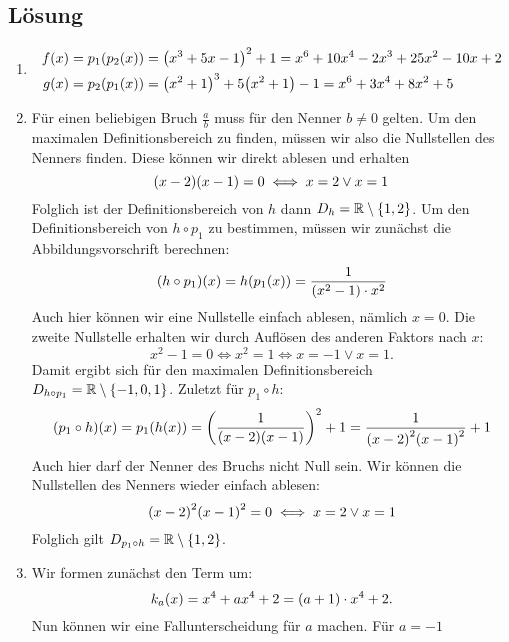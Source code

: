 \documentclass[german,12pt]{homework}
\newcommand{\RR}{\mathbb{R}}
\DeclarePairedDelimiter{\enbrace}{(}{)}
\DeclarePairedDelimiter{\penbrace}{\{}{\}}
\begin{document}
    \subsection*{Lösung}
    \begin{enumerate}
        \item
        \begin{align*}
            f\enbrace*{x} &= p_1\enbrace*{p_2\enbrace*{x}} = \enbrace*{x^3 + 5x
            - 1}^2 + 1 = x^6 + 10x^4 - 2x^3 + 25x^2 - 10x + 2\\
            g\enbrace*{x} &= p_2\enbrace*{p_1\enbrace*{x}} = \enbrace*{x^2 +
            1}^3 + 5\enbrace*{x^2 + 1} - 1 = x^6 + 3x^4 + 8x^2 + 5
        \end{align*}
        \item Für einen beliebigen Bruch \(\frac{a}{b}\) muss für den Nenner
        \(b \ne 0\) gelten. Um den maximalen Definitionsbereich zu finden,
        müssen wir also die Nullstellen des Nenners finden. Diese können wir
        direkt ablesen und erhalten
        \[\enbrace*{x - 2}\enbrace*{x - 1} = 0 \iff x = 2 \lor x = 1\]
        Folglich ist der Definitionsbereich von \(h\) dann \(D_h = \RR
        \setminus \penbrace*{1, 2}\). Um den Definitionsbereich von \(h \circ
        p_1\) zu bestimmen, müssen wir zunächst die Abbildungsvorschrift
        berechnen:
        \[\enbrace*{h \circ p_1}\enbrace*{x} = h\enbrace*{p_1\enbrace*{x}} =
        \frac{1}{\enbrace{x^2 - 1} \cdot x^2}\]
        Auch hier können wir eine Nullstelle einfach ablesen, nämlich \(x =
        0\). Die zweite Nullstelle erhalten wir durch Auflösen des anderen
        Faktors nach \(x\):
        \[x^2 - 1 = 0 \iff x^2 = 1 \iff x = -1 \lor x = 1.\]
        Damit ergibt sich für den maximalen Definitionsbereich \(D_{h \circ
        p_1} = \RR \setminus \penbrace*{-1, 0, 1}\). Zuletzt für \(p_1 \circ
        h\):
        \[\enbrace*{p_1 \circ h}\enbrace*{x} = p_1\enbrace*{h\enbrace*{x}} =
        \enbrace*{\frac{1}{\enbrace*{x - 2}\enbrace*{x - 1}}}^2 + 1 =
        \frac{1}{\enbrace*{x - 2}^2\enbrace*{x - 1}^2} + 1\]
        Auch hier darf der Nenner des Bruchs nicht Null sein. Wir können die
        Nullstellen des Nenners wieder einfach ablesen:
        \[\enbrace*{x - 2}^2\enbrace*{x - 1}^2 = 0 \iff x = 2 \lor x = 1\]
        Folglich gilt \(D_{p_1 \circ h} = \RR \setminus \penbrace*{1, 2}\).
        \item Wir formen zunächst den Term um:
        \[k_a\enbrace*{x} = x^4 + ax^4 + 2 = (a + 1) \cdot x^4 + 2.\]
        Nun können wir eine Fallunterscheidung für \(a\) machen. Für \(a = -1\)

\end{enumerate}
\end{document}
